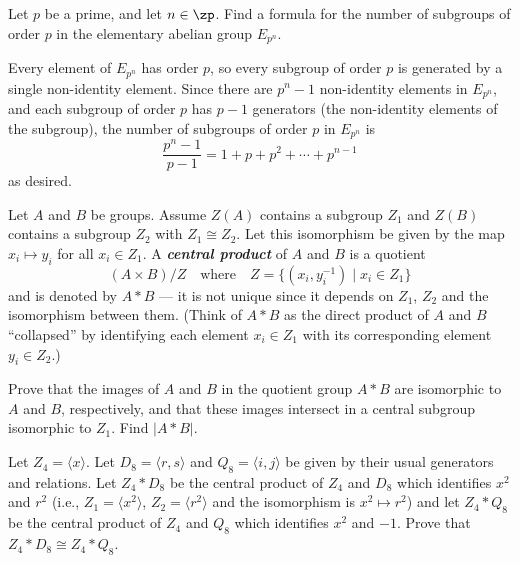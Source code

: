 \begin{exercise}\label{ex5.1.11}
    Let $p$ be a prime, and let $n \in \zp$. Find a formula for the number of subgroups of order $p$ in the elementary abelian group $E_{p^n}$.
\end{exercise}

\begin{sol}
    Every element of $E_{p^n}$ has order $p$, so every subgroup of order $p$ is generated by a single non-identity element. Since there are $p^n - 1$ non-identity elements in $E_{p^n}$, and each subgroup of order $p$ has $p - 1$ generators (the non-identity elements of the subgroup), the number of subgroups of order $p$ in $E_{p^n}$ is
    \[\frac{p^n - 1}{p - 1} = 1 + p + p^2 + \cdots + p^{n-1}\]
    as desired.
\end{sol}

\begin{specialexercise}\label{ex5.1.12}
    Let $A$ and $B$ be groups. Assume $Z(A)$ contains a subgroup $Z_1$ and $Z(B)$ contains a subgroup $Z_2$ with $Z_1 \cong Z_2$. Let this isomorphism be given by the map $x_i \mapsto y_i$ for all $x_i \in Z_1$. A \textbf{\emph{central product}} of $A$ and $B$ is a quotient
    \[(A \times B)/Z \quad \text{where} \quad Z = \{(x_i, y_i^{-1}) \mid x_i \in Z_1\}\]
    and is denoted by $A * B$ --- it is not unique since it depends on $Z_1$, $Z_2$ and the isomorphism between them. (Think of $A * B$ as the direct product of $A$ and $B$ ``collapsed'' by identifying each element $x_i \in Z_1$ with its corresponding element $y_i \in Z_2$.)
    \begin{subproblems}
        \item Prove that the images of $A$ and $B$ in the quotient group $A * B$ are isomorphic to $A$ and $B$, respectively, and that these images intersect in a central subgroup isomorphic to $Z_1$. Find $|A * B|$.
        \item Let $Z_4 = \langle x \rangle$. Let $D_8 = \langle r, s \rangle$ and $Q_8 = \langle i, j \rangle$ be given by their usual generators and relations. Let $Z_4 * D_8$ be the central product of $Z_4$ and $D_8$ which identifies $x^2$ and $r^2$ (i.e., $Z_1 = \langle x^2 \rangle$, $Z_2 = \langle r^2 \rangle$ and the isomorphism is $x^2 \mapsto r^2$) and let $Z_4 * Q_8$ be the central product of $Z_4$ and $Q_8$ which identifies $x^2$ and $-1$. Prove that $Z_4 * D_8 \cong Z_4 * Q_8$.
    \end{subproblems}
\end{specialexercise}

